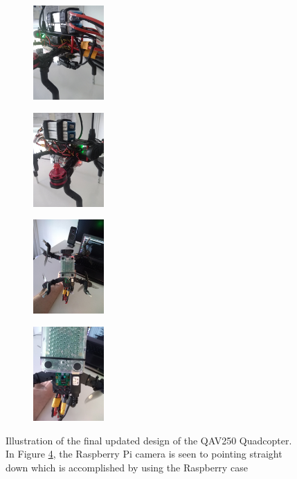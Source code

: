 \documentclass[../Head/report.tex]{subfiles}
\begin{document}
\begin{figure}[H]
    \centering
    \begin{subfigure}[b]{.20\textwidth}
        \centering
        \includegraphics[height=3.6cm]{../Figures/drone/drone_close1.jpg}
        \caption{}
        \label{fig:drone_close_one}
    \end{subfigure}
    \begin{subfigure}[b]{.20\textwidth}
        \centering
        \includegraphics[height=3.6cm]{../Figures/drone/drone_close2.jpg}
        \caption{}
        \label{fig:drone_close_two}
    \end{subfigure}
    \begin{subfigure}[b]{.20\textwidth}
        \centering
        \includegraphics[height=3.6cm]{../Figures/drone/drone_bottom.jpg}
        \caption{}
        \label{fig:drone_bottom}
    \end{subfigure}
    \begin{subfigure}[b]{.20\textwidth}
        \centering
        \includegraphics[height=3.6cm]{../Figures/drone/drone_bottom_zoom.jpg}
        \caption{}
        \label{fig:drone_bottom_zoom}
    \end{subfigure}
    \caption{Illustration of the final updated design of the QAV250 Quadcopter. In Figure \ref{fig:drone_bottom_zoom}, the Raspberry Pi camera is seen to pointing straight down which is accomplished by using the Raspberry case}
    \label{fig:drone_two}
\end{figure}
\end{document}

